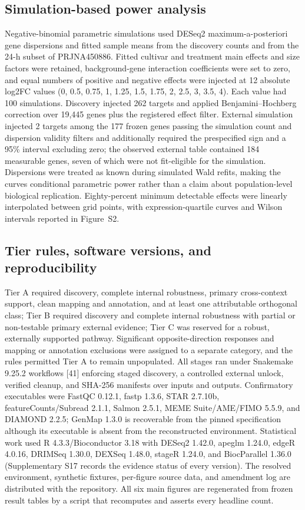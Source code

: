 \documentclass[referee,pdflatex,sn-basic,Numbered]{sn-jnl}
\begin{document}
\subsection{Simulation-based power analysis}

Negative-binomial parametric simulations used DESeq2 maximum-a-posteriori gene dispersions and fitted sample means from the discovery counts and from the 24-h subset of PRJNA450886. Fitted cultivar and treatment main effects and size factors were retained, background-gene interaction coefficients were set to zero, and equal numbers of positive and negative effects were injected at 12 absolute log2FC values (0, 0.5, 0.75, 1, 1.25, 1.5, 1.75, 2, 2.5, 3, 3.5, 4). Each value had 100 simulations. Discovery injected 262 targets and applied Benjamini--Hochberg correction over 19,445 genes plus the registered effect filter. External simulation injected 2 targets among the 177 frozen genes passing the simulation count and dispersion validity filters and additionally required the prespecified sign and a 95\% interval excluding zero; the observed external table contained 184 measurable genes, seven of which were not fit-eligible for the simulation. Dispersions were treated as known during simulated Wald refits, making the curves conditional parametric power rather than a claim about population-level biological replication. Eighty-percent minimum detectable effects were linearly interpolated between grid points, with expression-quartile curves and Wilson intervals reported in Figure~S2.

\subsection{Tier rules, software versions, and reproducibility}

Tier A required discovery, complete internal robustness, primary cross-context support, clean mapping and annotation, and at least one attributable orthogonal class; Tier B required discovery and complete internal robustness with partial or non-testable primary external evidence; Tier C was reserved for a robust, externally supported pathway. Significant opposite-direction responses and mapping or annotation exclusions were assigned to a separate category, and the rules permitted Tier A to remain unpopulated. All stages ran under Snakemake 9.25.2 workflows [41] enforcing staged discovery, a controlled external unlock, verified cleanup, and SHA-256 manifests over inputs and outputs. Confirmatory executables were FastQC 0.12.1, fastp 1.3.6, STAR 2.7.10b, featureCounts/Subread 2.1.1, Salmon 2.5.1, MEME Suite/AME/FIMO 5.5.9, and DIAMOND 2.2.5; GenMap 1.3.0 is recoverable from the pinned specification although its executable is absent from the reconstructed environment. Statistical work used R 4.3.3/Bioconductor 3.18 with DESeq2 1.42.0, apeglm 1.24.0, edgeR 4.0.16, DRIMSeq 1.30.0, DEXSeq 1.48.0, stageR 1.24.0, and BiocParallel 1.36.0 (Supplementary S17 records the evidence status of every version). The resolved environment, synthetic fixtures, per-figure source data, and amendment log are distributed with the repository. All six main figures are regenerated from frozen result tables by a script that recomputes and asserts every headline count.
\end{document}
